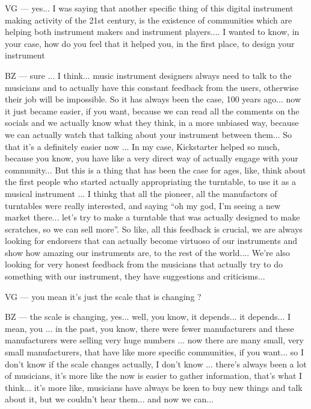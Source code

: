 VG — yes... I was saying that another specific thing of this digital instrument making activity of the 21st century, is the existence of communities which are helping both instrument makers and instrument players.... I wanted to know, in your case, how do you feel that it helped you, in the first place, to design your instrument 

BZ — sure ... I think... music instrument designers always need to talk to the musicians and to actually have this constant feedback from the users, otherwise their job will be impossible. So it has always been the case, 100 years ago... now it just became easier, if you want, because we can read all the comments on the socials and we actually know what they think, in a more unbiased way, because we can actually watch that talking about your instrument between them... So that it's a definitely easier now ... In my case, Kickstarter helped so much, because you know, you have like a very direct way of actually engage with your community... But this is a thing that has been the case for ages, like, think about the first people who started actually appropriating the turntable, to use it as a musical instrument ... I thinkg that all the pioneer, all the manufactors of turntables were really interested, and saying ``oh my god, I'm seeing a new market there... let's try to make a turntable that was actually designed to make scratches, so we can sell more''. So like, all this feedback is crucial, we are always looking for endorsers that can actually become virtuoso of our instruments and show how amazing our instruments are, to the rest of the world.... We're also looking for very honest feedback from the musicians that actually try to do something with our instrument, they have suggestions and criticisms...

VG — you mean it's just the scale that is changing ?

BZ — the scale is changing, yes... well, you know, it depends... it depends... I mean, you ... in the past, you know, there were fewer manufacturers and these manufacturers were selling very huge numbers ... now there are many small, very small manufacturers, that have like more specific communities, if you want... so I don't know if the scale changes actually, I don't know ...   there's always been a lot of musicians, it's more like the now is easier to gather information, that's what I think... it's more like, musicians have always be keen to buy new things and talk about it, but we couldn't hear them... and now we can...  

